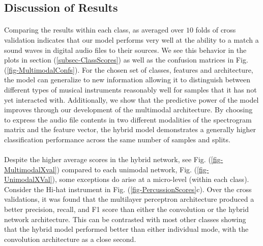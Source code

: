 \documentclass[12pt,letterpaper]{article}
\begin{document}

\subsection{Discussion of Results}

\paragraph*{}Comparing the results within each class, as averaged over $10$ folds of cross validation indicates that our model performs very well at the ability to a match a sound waves in digital audio files to their sources. We see this behavior in the plots in section (\ref{subsec-ClassScores}) as well as the confusion matrices in Fig. (\ref{fig-MultimodalConfs}). For the chosen set of classes, features and architecture, the model can generalize to new information allowing it to distinguish between different types of musical instruments reasonably well for samples that it has not yet interacted with. Additionally, we show that the predictive power of the model improves through our development of the multimodal architecture. By choosing to express the audio file contents in two different modalities of the spectrogram matrix and the feature vector, the hybrid model demonstrates a generally higher classification performance across the same number of samples and splits. 

\paragraph*{}Despite the higher average scores in the hybrid network, see Fig. (\ref{fig-MultimodalXval}) compared to each unimodal network, Fig. (\ref{fig-UnimodalXVal}), some exceptions do arise at a micro-level (within each class). Consider the Hi-hat instrument in Fig. (\ref{fig-PercussionScores}c). Over the cross validations, it was found that the multilayer perceptron architecture produced a better precision, recall, and F1 score than either the convolution or the hybrid network architecture. This can be contrasted with most other classes showing that the hybrid model performed better than either individual mode, with the convolution architecture as a close second. 
\end{document}
